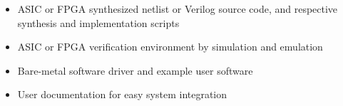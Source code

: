 \begin{itemize}
  \itemsep-0.5em
\item ASIC or FPGA synthesized netlist or Verilog source code, and respective
  synthesis and implementation scripts
\item ASIC or FPGA verification environment by simulation and emulation
\item Bare-metal software driver and example user software
\item User documentation for easy system integration
\end{itemize}
